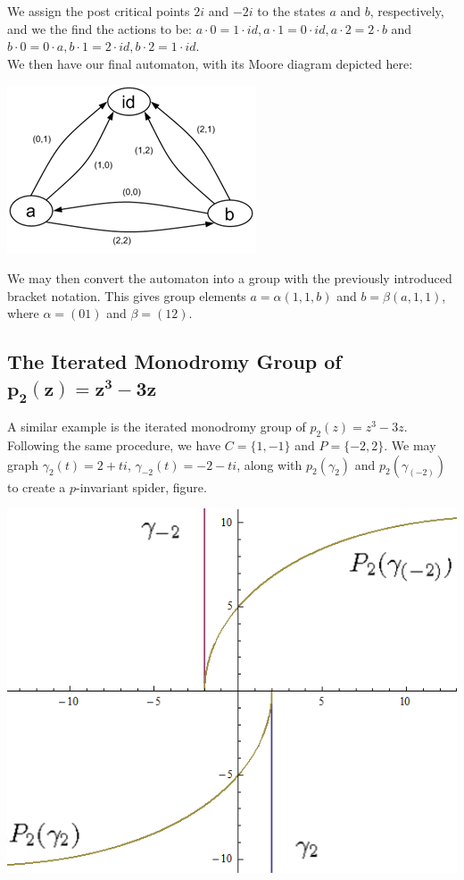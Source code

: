 \documentclass[11pt]{amsart}
\theoremstyle{definition}
\theoremstyle{remark}
\numberwithin{equation}{section}
\begin{document}
\indent  We assign the post critical points $2i$ and $-2i$ to the states $a$ and $b$, respectively, and we the find the actions to be:
$a \cdot 0 = 1 \cdot id, a \cdot 1 = 0 \cdot id, a \cdot 2 = 2 \cdot b$ and $b \cdot 0 = 0 \cdot a, b \cdot 1 = 2 \cdot id, b \cdot 2 = 1 \cdot id$.\\
\indent We then have our final automaton, with its Moore diagram depicted here: 

\begin{center}
\includegraphics{z_33z.png}
\end{center}

\indent We may then convert the automaton into a group with the previously introduced bracket notation. This gives group elements $a = \alpha(1, 1, b)$ and $b = \beta(a, 1, 1)$, where $ \alpha = (0 1)$ and $\beta = (1 2)$.  

\subsection{The Iterated Monodromy Group of $\mathbf{p_2(z)=z^3-3z}$} \text{\space}


\indent A similar example is the iterated monodromy group of $p_2(z) = z^3 - 3z$.  Following the same procedure, we have $C = \{1, -1\}$ and $P = \{-2, 2\}$. We may graph $\gamma_{2}(t) = 2 + ti$, $\gamma_{-2}(t) = -2 - ti$, along with $p_2(\gamma_{2})$ and $p_2(\gamma_{(-2)})$ to create a $p$-invariant spider, figure.\\

\begin{center}
\includegraphics[scale=0.5]{minus_3_spider2.png}
\end{center}
\end{document}
